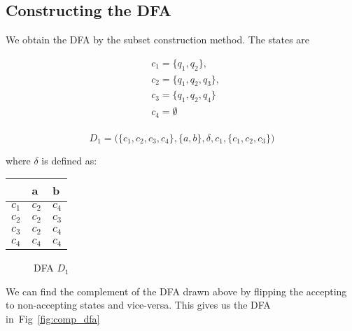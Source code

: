 \subsection*{Constructing the DFA}
We obtain the DFA by the subset construction method. The states are

\begin{equation}
\begin{split}
    & c_1 = \{q_1, q_2\},\\
    & c_2 = \{q_1, q_2, q_3\},\\
    & c_3 = \{q_1, q_2, q_4\}\\
    & c_4 = \emptyset \\
\end{split}
\end{equation}

\[ 
D_1 = \big( \{c_1, c_2, c_3, c_4\}, \{a,b\}, \delta, c_1, \{c_1, c_2, c_3\} \big)
\]

where $\delta$ is defined as:
\begin{tabular}{|l|l|l|}
\hline
    & a   & b   \\ \hline
$c_1$ & $c_2$ & $c_4$ \\
$c_2$ & $c_2$ & $c_3$ \\
$c_3$ & $c_2$ & $c_4$ \\
$c_4$ & $c_4$ & $c_4$ \\ \hline
\end{tabular}

\begin{figure}[ht]
\centering
{}
\caption{DFA $D_1$}
\label{fig:dfa}
\end{figure}



We can find the complement of the DFA drawn above by flipping the
accepting to non-accepting states and vice-versa. This gives
us the DFA in~Fig~\ref{fig:comp_dfa}

